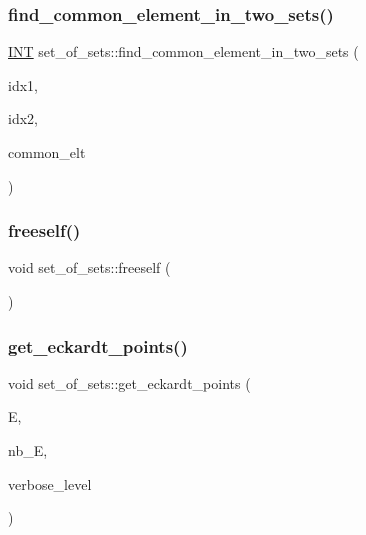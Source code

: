 \subsubsection{\texorpdfstring{find\+\_\+common\+\_\+element\+\_\+in\+\_\+two\+\_\+sets()}{find\_common\_element\_in\_two\_sets()}}
{\footnotesize\ttfamily \mbox{\hyperlink{galois_8h_a09fddde158a3a20bd2dcadb609de11dc}{I\+NT}} set\+\_\+of\+\_\+sets\+::find\+\_\+common\+\_\+element\+\_\+in\+\_\+two\+\_\+sets (\begin{DoxyParamCaption}\item[{\mbox{\hyperlink{galois_8h_a09fddde158a3a20bd2dcadb609de11dc}{I\+NT}}}]{idx1,  }\item[{\mbox{\hyperlink{galois_8h_a09fddde158a3a20bd2dcadb609de11dc}{I\+NT}}}]{idx2,  }\item[{\mbox{\hyperlink{galois_8h_a09fddde158a3a20bd2dcadb609de11dc}{I\+NT}} \&}]{common\+\_\+elt }\end{DoxyParamCaption})}

\mbox{\label{classset__of__sets_a7beb89198bccadbc37ac231ba7213e48}} 
\subsubsection{\texorpdfstring{freeself()}{freeself()}}
{\footnotesize\ttfamily void set\+\_\+of\+\_\+sets\+::freeself (\begin{DoxyParamCaption}{ }\end{DoxyParamCaption})}

\mbox{\label{classset__of__sets_af6713e71ef5a1b7cc7892d78900166c4}} 
\subsubsection{\texorpdfstring{get\+\_\+eckardt\+\_\+points()}{get\_eckardt\_points()}}
{\footnotesize\ttfamily void set\+\_\+of\+\_\+sets\+::get\+\_\+eckardt\+\_\+points (\begin{DoxyParamCaption}\item[{\mbox{\hyperlink{galois_8h_a09fddde158a3a20bd2dcadb609de11dc}{I\+NT}} $\ast$\&}]{E,  }\item[{\mbox{\hyperlink{galois_8h_a09fddde158a3a20bd2dcadb609de11dc}{I\+NT}} \&}]{nb\+\_\+E,  }\item[{\mbox{\hyperlink{galois_8h_a09fddde158a3a20bd2dcadb609de11dc}{I\+NT}}}]{verbose\+\_\+level }\end{DoxyParamCaption})}

